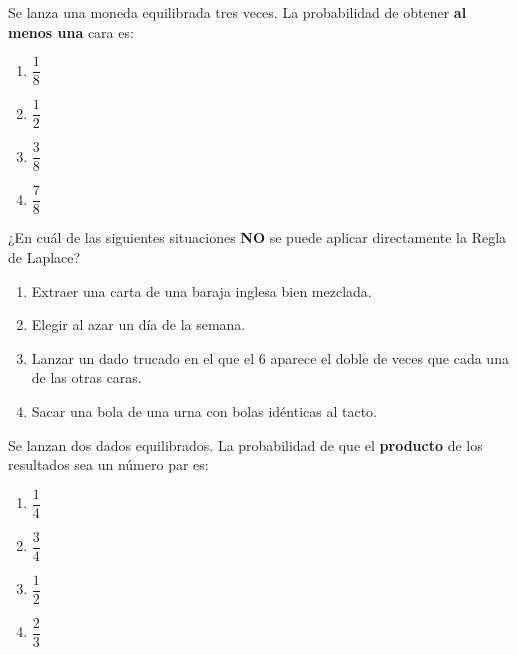 \documentclass[12pt, a4paper]{article} %
\begin{document}
\begin{enumerate}[leftmargin=*]
    \begin{minipage}{\linewidth}
    \item Se lanza una moneda equilibrada tres veces. La probabilidad de obtener \textbf{al menos una} cara es:
    \begin{enumerate}
        \item $\dfrac{1}{8}$
        \item $\dfrac{1}{2}$
        \item $\dfrac{3}{8}$
        \item $\dfrac{7}{8}$
    \end{enumerate}
    \end{minipage}
    \vspace{0.5cm}

    \begin{minipage}{\linewidth}
    \item ¿En cuál de las siguientes situaciones \textbf{NO} se puede aplicar directamente la Regla de Laplace?
    \begin{enumerate}
        \item Extraer una carta de una baraja inglesa bien mezclada.
        \item Elegir al azar un día de la semana.
        \item Lanzar un dado trucado en el que el 6 aparece el doble de veces que cada una de las otras caras.
        \item Sacar una bola de una urna con bolas idénticas al tacto.
    \end{enumerate}
    \end{minipage}
    \vspace{0.5cm}

    \begin{minipage}{\linewidth}
    \item Se lanzan dos dados equilibrados. La probabilidad de que el \textbf{producto} de los resultados sea un número par es:
    \begin{enumerate}
        \item $\dfrac{1}{4}$
        \item $\dfrac{3}{4}$
        \item $\dfrac{1}{2}$
        \item $\dfrac{2}{3}$
    \end{enumerate}
    \end{minipage}
    \vspace{0.5cm}


\end{enumerate}
\end{document}
